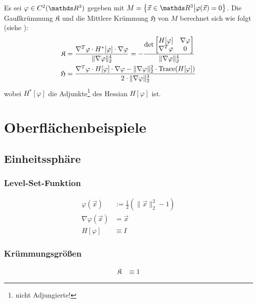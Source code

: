   Es sei \( \varphi\in C^{2}(\R^{3}) \) gegeben mit \( M = \left\{ \vec{x}\in\R^{3} \middle| \varphi(\vec{x}) = 0 \right\} \).
  Die Gaußkrümmung \( \mathfrak{K} \) und die Mittlere Krümmung \( \mathfrak{H} \) von \( M \) berechnet sich wie folgt (siehe \cite{CurvatureFormulas}):
  \begin{align}
    \mathfrak{K} &= \frac{\nabla^{T}\varphi \cdot H^{*}[\varphi] \cdot \nabla\varphi}{ \|\nabla\varphi\|_{2}^{4}}
                 = - \frac{\det \begin{bmatrix} H[\varphi] & \nabla\varphi \\ \nabla^{T}\varphi & 0 \end{bmatrix}}{\|\nabla\varphi\|_{2}^{4}} \\
    \mathfrak{H} &= \frac{\nabla^{T}\varphi \cdot H[\varphi] \cdot \nabla\varphi - \|\nabla\varphi\|_{2}^{2}\cdot\text{Trace}(H[\varphi])}
                        {2\cdot\|\nabla\varphi\|_{2}^{3}}
  \end{align}
  wobei \( H^{*}[\varphi] \) die Adjunkte\footnote{nicht Adjungierte!} des Hessian \( H[\varphi] \) ist.


\section{Oberflächenbeispiele}

  \subsection{Einheitssphäre}
    \label{sphere}

    \subsubsection{Level-Set-Funktion}
      \begin{align}
        \varphi(\vec{x}) &:= \frac{1}{2}\left( \|\vec{x}\|_{2}^{2} - 1 \right) \\
        \nabla\varphi(\vec{x}) &= \vec{x} \\
        H[\varphi] &\equiv I
      \end{align}

     \subsubsection{Krümmungsgrößen}
      \begin{align}
        \mathfrak{K} &\equiv 1
      \end{align}

